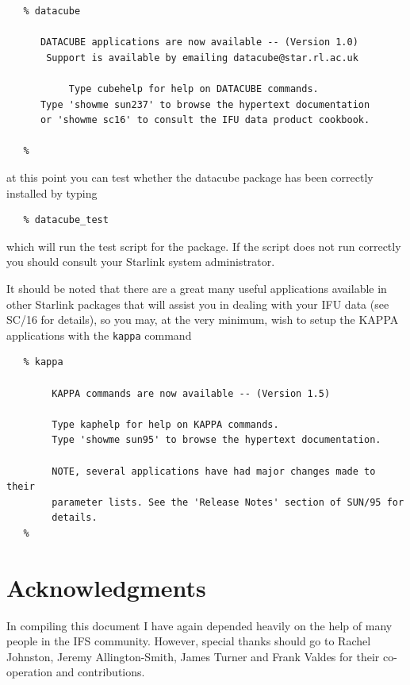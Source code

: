 \documentclass[twoside,11pt]{article}
\newcommand{\htmladdnormallink}[2]{#1}
\newcommand{\xref}[3]{#1}
\newcommand{\xlabel}[1]{}
\begin{document}
\small\begin{verbatim}
   % datacube
    
      DATACUBE applications are now available -- (Version 1.0)
       Support is available by emailing datacube@star.rl.ac.uk
    
           Type cubehelp for help on DATACUBE commands.
      Type 'showme sun237' to browse the hypertext documentation
      or 'showme sc16' to consult the IFU data product cookbook.
  
   %
\end{verbatim}\normalsize

at this point you can test whether the datacube package has been
correctly installed by typing

\small\begin{verbatim}
   % datacube_test
\end{verbatim}\normalsize

which will run the test script for the package. If the script does not
run correctly you should consult your Starlink system administrator.

It should be noted that there are a great many useful applications
available in other Starlink packages that will assist you in dealing
with your IFU data (see \xref{SC/16}{sc16}{} for details), so you may,
at the very minimum, wish to setup the \xref{KAPPA}{sun95}{}
applications with the {\tt kappa} command

\small\begin{verbatim}
   % kappa
 
        KAPPA commands are now available -- (Version 1.5)

        Type kaphelp for help on KAPPA commands.
        Type 'showme sun95' to browse the hypertext documentation.

        NOTE, several applications have had major changes made to their
        parameter lists. See the 'Release Notes' section of SUN/95 for
        details.
   %	
\end{verbatim}\normalsize

\section*{\xlabel{sun237_acks}Acknowledgments\label{sun237_acks}}

In compiling this document I have again depended heavily on the help
of many people in the IFS community. However, special thanks should go
to \htmladdnormallink{Rachel
Johnston}{http://www.ast.cam.ac.uk/~raj/}, \htmladdnormallink{Jeremy
Allington-Smith}{http://star-www.dur.ac.uk:80/~jra/},
\htmladdnormallink{James Turner}{mailto:J.E.H.Turner@durham.ac.uk} and
\htmladdnormallink{Frank Valdes}{http://www.noao.edu/noao/scistaff/valdes.html} for their
co-operation and contributions.
\end{document}
